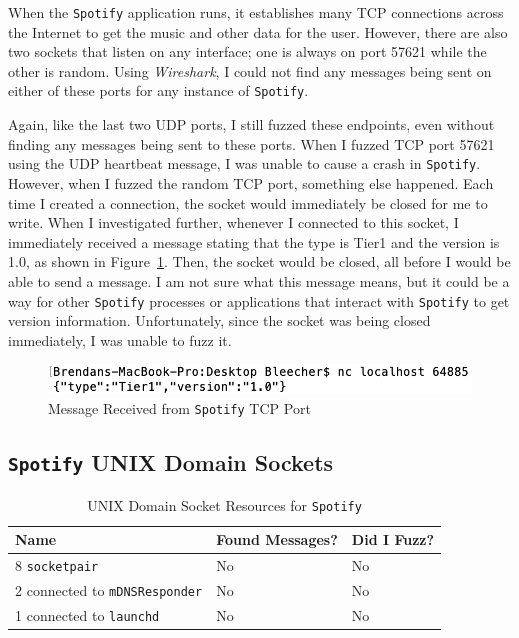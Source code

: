 When the \texttt{Spotify} application runs, it establishes many TCP connections across the Internet to get the music and other data for the user.  However, there are also two sockets that listen on any interface; one is always on port 57621 while the other is random.  Using \textit{Wireshark}, I could not find any messages being sent on either of these ports for any instance of \texttt{Spotify}.

Again, like the last two UDP ports, I still fuzzed these endpoints, even without finding any messages being sent to these ports.  When I fuzzed TCP port 57621 using the UDP heartbeat message, I was unable to cause a crash in \texttt{Spotify}.  However, when I fuzzed the random TCP port, something else happened.  Each time I created a connection, the socket would immediately be closed for me to write.  When I investigated further, whenever I connected to this socket, I immediately received a message stating that the type is Tier1 and the version is 1.0, as shown in Figure~\ref{fig:spotifyTcpResponse}.  Then, the socket would be closed, all before I would be able to send a message.  I am not sure what this message means, but it could be a way for other \texttt{Spotify} processes or applications that interact with \texttt{Spotify} to get version information.  Unfortunately, since the socket was being closed immediately, I was unable to fuzz it.

\begin{figure}
\centering
\includegraphics[width=1\textwidth]{spotifyMessage.png}
\caption{Message Received from \texttt{Spotify} TCP Port}
\label{fig:spotifyTcpResponse}
\end{figure}

\subsection{\texttt{Spotify} UNIX Domain Sockets}
\label{sec:spotifyUnix}

\begin{table}
\centering
\begin{normalsize}
\begin{tabular}{ l | l | l }
\textbf{Name} & \textbf{Found Messages?} & \textbf{Did I Fuzz?} \\ \hline
8 \texttt{socketpair} & No & No \\ \hline
2 connected to \texttt{mDNSResponder} & No & No \\ \hline
1 connected to \texttt{launchd} & No & No \\ \hline
\end{tabular}
\caption{UNIX Domain Socket Resources for \texttt{Spotify}}
\label{tab:spotifyUnixTab}
\end{normalsize}
\end{table} 

